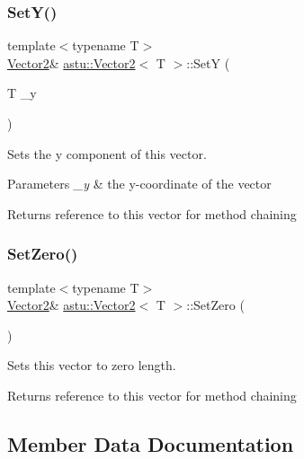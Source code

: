 \subsubsection{\texorpdfstring{Set\+Y()}{SetY()}}
{\footnotesize\ttfamily template$<$typename T$>$ \\
\hyperlink{classastu_1_1Vector2}{Vector2}\& \hyperlink{classastu_1_1Vector2}{astu\+::\+Vector2}$<$ T $>$\+::SetY (\begin{DoxyParamCaption}\item[{T}]{\+\_\+y }\end{DoxyParamCaption})\hspace{0.3cm}{\ttfamily [inline]}}

Sets the y component of this vector.


\begin{DoxyParams}{Parameters}
{\em \+\_\+y} & the y-\/coordinate of the vector \\
\hline
\end{DoxyParams}
\begin{DoxyReturn}{Returns}
reference to this vector for method chaining 
\end{DoxyReturn}
\mbox{\label{classastu_1_1Vector2_a70eb8d4b44d3f973c5065a0ed5f9c01c}} 
\subsubsection{\texorpdfstring{Set\+Zero()}{SetZero()}}
{\footnotesize\ttfamily template$<$typename T$>$ \\
\hyperlink{classastu_1_1Vector2}{Vector2}\& \hyperlink{classastu_1_1Vector2}{astu\+::\+Vector2}$<$ T $>$\+::Set\+Zero (\begin{DoxyParamCaption}{ }\end{DoxyParamCaption})\hspace{0.3cm}{\ttfamily [inline]}}

Sets this vector to zero length.

\begin{DoxyReturn}{Returns}
reference to this vector for method chaining 
\end{DoxyReturn}


\subsection{Member Data Documentation}
\mbox{\label{classastu_1_1Vector2_aa60c30b27742255fbe7053b07a7e76ba}} 
